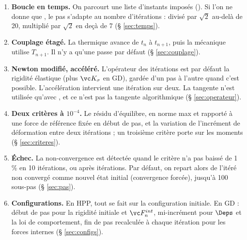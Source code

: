 \begin{enumerate}
\item \textbf{Boucle en temps.} On parcourt une liste d'instants imposés (). Si l'on ne donne que , le pas s'adapte au nombre d'itérations : divisé par $\sqrt2$ au-delà de 20, multiplié par $\sqrt2$ en deçà de 7 (§ \ref{sec:temps}).
\item \textbf{Couplage étagé.} La thermique avance de $t_n$ à $t_{n+1}$, puis la mécanique utilise $T_{n+1}$. Il n'y a qu'une passe par défaut (§ \ref{sec:couplage}).
\item \textbf{Newton modifié, accéléré.} L'opérateur des itérations est par défaut la rigidité élastique (plus $\vc K_\sigma$ en GD), gardée d'un pas à l'autre quand c'est possible. L'accélération  intervient une itération sur deux. La tangente n'est utilisée qu'avec , et ce n'est pas la tangente algorithmique (§ \ref{sec:operateur}).
\item \textbf{Deux critères à $10^{-4}$.} Le résidu d'équilibre, en norme max et rapporté à une force de référence fixée en début de pas, et la variation de l'incrément de déformation entre deux itérations ; un troisième critère porte sur les moments (§ \ref{sec:criteres}).
\item \textbf{Échec.} La non-convergence est détectée quand le critère n'a pas baissé de 1\,\% en 10 itérations, ou après  itérations. Par défaut, on repart alors de l'itéré non convergé comme nouvel état initial (convergence forcée), jusqu'à 100 sous-pas (§ \ref{sec:pas}).
\item \textbf{Configurations.} En HPP, tout se fait sur la configuration initiale. En GD : début de pas pour la rigidité initiale et $\vc F^{int}_n$, mi-incrément pour $\Deps$ et la loi de comportement, fin de pas recalculée à chaque itération pour les forces internes (§ \ref{sec:configs}).
\end{enumerate}
